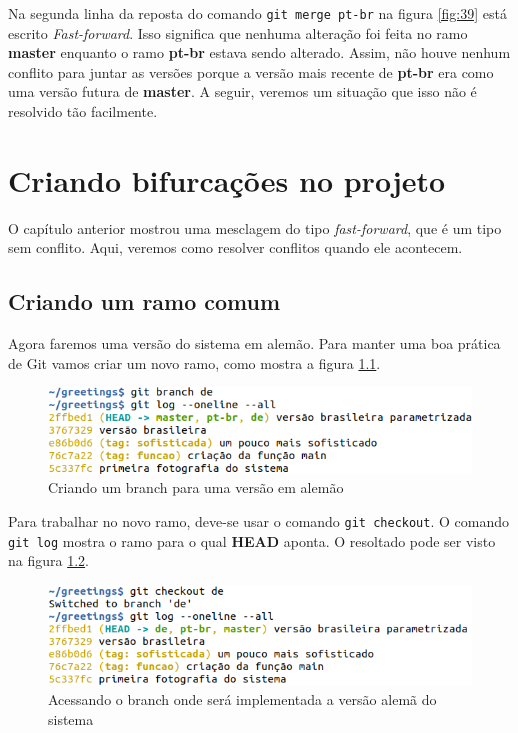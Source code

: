 \documentclass[a4paper]{book}
\begin{document}
Na segunda linha da reposta do comando
\texttt{git merge pt-br} na figura \ref{fig:39} 
está escrito \textit{Fast-forward}.
Isso significa que nenhuma alteração foi feita no
ramo \textbf{master} enquanto o ramo \textbf{pt-br}
estava sendo alterado.
Assim, não houve nenhum conflito para juntar as versões
porque a versão mais recente de \textbf{pt-br}
era como uma versão futura de \textbf{master}.
A seguir, veremos um situação que isso não é resolvido tão
facilmente.

\chapter{Criando bifurcações no projeto}

O capítulo anterior mostrou uma mesclagem do tipo
\textit{fast-forward}, que é um tipo sem conflito.
Aqui, veremos como resolver conflitos quando ele acontecem.

\section{Criando um ramo comum}

Agora faremos uma versão do sistema em alemão.
Para manter uma boa prática de Git vamos criar um novo
ramo, como mostra a figura \ref{fig:41}.

\begin{figure}[ht]
\caption{Criando um branch para uma versão em alemão}
\label{fig:41}
\centering
\includegraphics[scale=0.6]{"images/41-Criando um branch para uma versão em alemão.png"}
\end{figure}

Para trabalhar no novo ramo, deve-se usar o comando
\texttt{git checkout}. O comando \texttt{git log}
mostra o ramo para o qual \textbf{HEAD} aponta.
O resoltado pode ser visto na figura \ref{fig:42}.

\begin{figure}[ht]
\caption{Acessando o branch onde será implementada a versão alemã do sistema}
\label{fig:42}
\centering
\includegraphics[scale=0.6]{"images/42-Acessando o branch onde será implementada a versão alemã do sistema.png"}
\end{figure}
\end{document}
